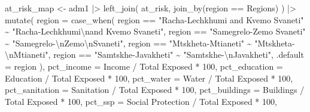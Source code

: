 \documentclass[
  letterpaper,
  DIV=11,
  numbers=noendperiod]{scrartcl}
\newenvironment{Shaded}{}{}
\newcommand{\AttributeTok}[1]{\textcolor[rgb]{0.84,0.23,0.29}{#1}}
\newcommand{\DecValTok}[1]{\textcolor[rgb]{0.00,0.36,0.77}{#1}}
\newcommand{\FunctionTok}[1]{\textcolor[rgb]{0.44,0.26,0.76}{#1}}
\newcommand{\NormalTok}[1]{\textcolor[rgb]{0.14,0.16,0.18}{#1}}
\newcommand{\OtherTok}[1]{\textcolor[rgb]{0.44,0.26,0.76}{#1}}
\newcommand{\SpecialCharTok}[1]{\textcolor[rgb]{0.00,0.36,0.77}{#1}}
\newcommand{\StringTok}[1]{\textcolor[rgb]{0.01,0.18,0.38}{#1}}
\begin{document}
\begin{Shaded}
\begin{Highlighting}[]
\NormalTok{at\_risk\_map }\OtherTok{\textless{}{-}}\NormalTok{ adm1 }\SpecialCharTok{|\textgreater{}} 
  \FunctionTok{left\_join}\NormalTok{(}
\NormalTok{    at\_risk,}
    \FunctionTok{join\_by}\NormalTok{(region }\SpecialCharTok{==}\NormalTok{ Regions)}
\NormalTok{  ) }\SpecialCharTok{|\textgreater{}} 
  \FunctionTok{mutate}\NormalTok{(}
    \AttributeTok{region =} \FunctionTok{case\_when}\NormalTok{(}
\NormalTok{      region }\SpecialCharTok{==} \StringTok{"Racha{-}Lechkhumi and Kvemo Svaneti"} \SpecialCharTok{\textasciitilde{}}
      \StringTok{"Racha{-}Lechkhumi}\SpecialCharTok{\textbackslash{}n}\StringTok{and Kvemo Svaneti"}\NormalTok{,}
\NormalTok{      region }\SpecialCharTok{==} \StringTok{"Samegrelo{-}Zemo Svaneti"} \SpecialCharTok{\textasciitilde{}}
      \StringTok{"Samegrelo{-}}\SpecialCharTok{\textbackslash{}n}\StringTok{Zemo}\SpecialCharTok{\textbackslash{}n}\StringTok{Svaneti"}\NormalTok{,}
\NormalTok{      region }\SpecialCharTok{==} \StringTok{"Mtskheta{-}Mtianeti"} \SpecialCharTok{\textasciitilde{}}
      \StringTok{"Mtskheta{-}}\SpecialCharTok{\textbackslash{}n}\StringTok{Mtianeti"}\NormalTok{,}
\NormalTok{      region }\SpecialCharTok{==} \StringTok{"Samtskhe{-}Javakheti"} \SpecialCharTok{\textasciitilde{}}
      \StringTok{"Samtskhe{-}}\SpecialCharTok{\textbackslash{}n}\StringTok{Javakheti"}\NormalTok{,}
      \AttributeTok{.default =}\NormalTok{ region}
\NormalTok{    ),}
    \AttributeTok{pct\_income =}\NormalTok{ Income }\SpecialCharTok{/} \StringTok{\textasciigrave{}}\AttributeTok{Total Exposed}\StringTok{\textasciigrave{}} \SpecialCharTok{*} \DecValTok{100}\NormalTok{,}
    \AttributeTok{pct\_education =}\NormalTok{ Education  }\SpecialCharTok{/} \StringTok{\textasciigrave{}}\AttributeTok{Total Exposed}\StringTok{\textasciigrave{}} \SpecialCharTok{*} \DecValTok{100}\NormalTok{,}
    \AttributeTok{pct\_water =}\NormalTok{ Water }\SpecialCharTok{/} \StringTok{\textasciigrave{}}\AttributeTok{Total Exposed}\StringTok{\textasciigrave{}} \SpecialCharTok{*} \DecValTok{100}\NormalTok{,}
    \AttributeTok{pct\_sanitation =}\NormalTok{ Sanitation  }\SpecialCharTok{/} \StringTok{\textasciigrave{}}\AttributeTok{Total Exposed}\StringTok{\textasciigrave{}} \SpecialCharTok{*} \DecValTok{100}\NormalTok{,}
    \AttributeTok{pct\_buildings =}\NormalTok{ Buildings }\SpecialCharTok{/} \StringTok{\textasciigrave{}}\AttributeTok{Total Exposed}\StringTok{\textasciigrave{}} \SpecialCharTok{*} \DecValTok{100}\NormalTok{,}
    \AttributeTok{pct\_ssp =} \StringTok{\textasciigrave{}}\AttributeTok{Social Protection}\StringTok{\textasciigrave{}} \SpecialCharTok{/} \StringTok{\textasciigrave{}}\AttributeTok{Total Exposed}\StringTok{\textasciigrave{}} \SpecialCharTok{*} \DecValTok{100}\NormalTok{,}

\end{Highlighting}
\end{Shaded}
\end{document}
